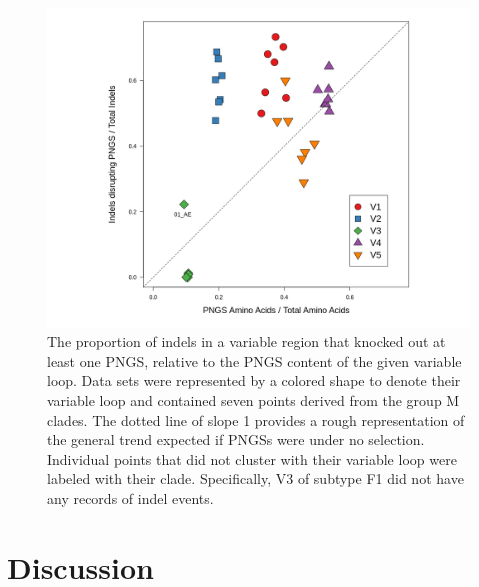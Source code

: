 \documentclass[12pt]{article}
\begin{document}
\begin{figure}
    \centering
	\includegraphics[width=.7\textwidth,trim={35mm 10mm 15mm 10mm}, clip]{indel-disrupt}
    \caption{
    The proportion of indels in a variable region that knocked out at least one PNGS, relative to the PNGS content of the given variable loop. 
    Data sets were represented by a colored shape to denote their variable loop and contained seven points derived from the group M clades.
    The dotted line of slope 1 provides a rough representation of the general trend expected if PNGSs were under no selection.    
    Individual points that did not cluster with their variable loop were labeled with their clade. 
    Specifically, V3 of subtype F1 did not have any records of indel events. 
    }
    \label{indel-disrupt}
\end{figure}



\section * {Discussion}
\end{document}
